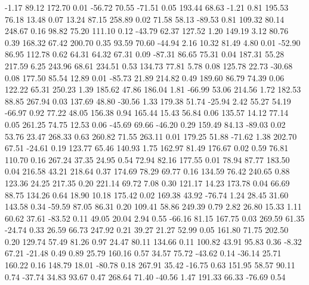    -1.17   89.12  172.70    0.01
  -56.72   70.55  -71.51    0.05
  193.44   68.63   -1.21    0.81
  195.53   76.18   13.48    0.07
   13.24   87.15  258.89    0.02
   71.58   58.13  -89.53    0.81
  109.32   80.14  248.67    0.16
   98.82   75.20  111.10    0.12
  -43.79   62.37  127.52    1.20
  149.19    3.12   80.76    0.39
  168.32   67.42  200.70    0.35
   93.59   70.60  -44.94    2.16
   10.32   81.49    4.80    0.01
  -52.90   86.95  112.78    0.62
   64.31   64.32   67.31    0.09
  -87.31   86.65   75.31    0.04
  187.31   55.28  217.59    6.25
  243.96   68.61  234.51    0.53
  134.73   77.81    5.78    0.08
  125.78   22.73  -30.68    0.08
  177.50   85.54   12.89    0.01
  -85.73   21.89  214.82    0.49
  189.60   86.79   74.39    0.06
  122.22   65.31  250.23    1.39
  185.62   47.86  186.04    1.81
  -66.99   53.06  214.56    1.72
  182.53   88.85  267.94    0.03
  137.69   48.80  -30.56    1.33
  179.38   51.74  -25.94    2.42
   55.27   54.19  -66.97    0.92
   77.22   48.05  156.38    0.94
  165.44   15.43   56.84    0.06
  135.57   14.12   77.14    0.05
  261.25   74.75   12.53    0.06
  -45.69   69.66  -46.20    0.29
  159.49   84.13  -89.03    0.02
   53.76   23.47  268.33    0.63
  260.82   71.55  263.11    0.01
  179.25   51.88  -71.62    1.38
  202.70   67.51  -24.61    0.19
  123.77   65.46  140.93    1.75
  162.97   81.49  176.67    0.02
    0.59   76.81  110.70    0.16
  267.24   37.35   24.95    0.54
   72.94   82.16  177.55    0.01
   78.94   87.77  183.50    0.04
  216.58   43.21  218.64    0.37
  174.69   78.29   69.77    0.16
  134.59   76.42  240.65    0.88
  123.36   24.25  217.35    0.20
  221.14   69.72    7.08    0.30
  121.17   14.23  173.78    0.04
   66.69   88.75  134.26    0.64
   18.90   10.18  175.42    0.02
  169.38   43.92  -76.74    1.24
   28.45   31.60  143.58    0.34
  -59.59   87.05   86.31    0.20
  109.41   58.86  249.39    0.79
    2.82   26.80   15.33    1.11
   60.62   37.61  -83.52    0.11
   49.05   20.04    2.94    0.55
  -66.16   81.15  167.75    0.03
  269.59   61.35  -24.74    0.33
   26.59   66.73  247.92    0.21
   39.27   21.27   52.99    0.05
  161.80   71.75  202.50    0.20
  129.74   57.49   81.26    0.97
   24.47   80.11  134.66    0.11
  100.82   43.91   95.83    0.36
   -8.32   67.21  -21.48    0.49
    0.89   25.79  160.16    0.57
   34.57   75.72  -43.62    0.14
  -36.14   25.71  160.22    0.16
  148.79   18.01  -80.78    0.18
  267.91   35.42  -16.75    0.63
  151.95   58.57   90.11    0.74
  -37.74   34.83   93.67    0.47
  268.64   71.40  -40.56    1.47
  191.33   66.33  -76.69    0.54
